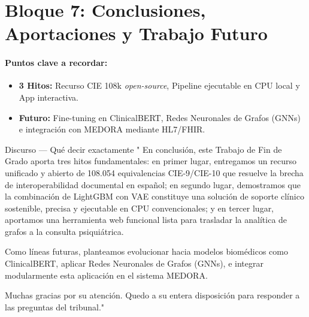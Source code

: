 \documentclass[11pt, a4paper]{article}
\newcommand{\timebadge}[2]{%
  \tcbox[
    on line,
    colback=timeBadge,
    colframe=speechBorder,
    arc=2mm,
    boxrule=0.5pt,
    top=1mm, bottom=1mm, left=2mm, right=2mm
  ]{\small \faClock\ \textbf{#1} \quad \textcolor{gray}{(#2)}}%
}
\begin{document}
\section{Bloque 7: Conclusiones, Aportaciones y Trabajo Futuro}
\timebadge{1 min 00 s}{Minuto 9:00 - 10:00}

\paragraph{Puntos clave a recordar:}
\begin{itemize}[noitemsep]
    \item \textbf{3 Hitos:} Recurso CIE 108k \textit{open-source}, Pipeline ejecutable en CPU local y App interactiva.
    \item \textbf{Futuro:} Fine-tuning en ClinicalBERT, Redes Neuronales de Grafos (GNNs) e integración con MEDORA mediante HL7/FHIR.
\end{itemize}

\begin{speechbox}{Discurso — Qué decir exactamente}
" En conclusión, este Trabajo de Fin de Grado aporta tres hitos fundamentales: en primer lugar, entregamos un recurso unificado y abierto de 108.054 equivalencias CIE-9/CIE-10 que resuelve la brecha de interoperabilidad documental en español; en segundo lugar, demostramos que la combinación de LightGBM con VAE constituye una solución de soporte clínico sostenible, precisa y ejecutable en CPU convencionales; y en tercer lugar, aportamos una herramienta web funcional lista para trasladar la analítica de grafos a la consulta psiquiátrica.

Como líneas futuras, planteamos evolucionar hacia modelos biomédicos como ClinicalBERT, aplicar Redes Neuronales de Grafos (GNNs), e integrar modularmente esta aplicación en el sistema MEDORA.

Muchas gracias por su atención. Quedo a su entera disposición para responder a las preguntas del tribunal."
\end{speechbox}
\end{document}
